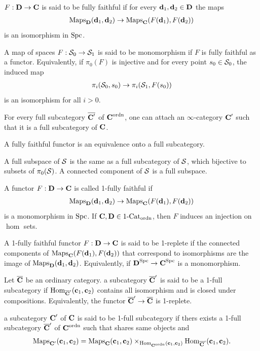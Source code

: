 {\np $F:\D\to\C$ is said to be fully faithful if for every $\d_1,\d_2\in\D$ the maps
\begin{align*}
    \maps_{\D}(\d_1,\d_2) \to \maps_{\C}(F(\d_1),F(\d_2))
\end{align*}
is an isomorphism in $\spc$.

\np A map of spaces $F:\S_0\to \S_1$ is said to be monomorphism if $F$ is fully faithful as a functor.
Equivalently, if $\pi_0(F)$ is injective and for every point $s_0\in\S_0$, the induced map 
\begin{align*}
    \pi_i(\S_0,s_0) \to \pi_i(\S_1,F(s_0))
\end{align*}
is an isomorphism for all $i>0$.

\np For every full subcategory $\bar{\C'}$ of $\C^{\ordn}$, one can attach an $\infty$-category $\C'$ such that it is a 
full subcategory of $\C$.

\np A fully faithful functor is an equivalence onto a full subcategory.

\np A full subspace of $\S$ is the same as a full subcategory of $\S$, which bijective to subsets of $\pi_0(\S)$.
A connected component of $\S$ is a full subspace.

\np A functor $F:\D\to \C$ is called 1-fully faithful if 
\begin{align*}
    \maps_{\D}(\d_1,\d_2) \to \maps_{\C}(F(\d_1),F(\d_2))
\end{align*}
is a monomorphism in $\spc$. If $\C,\D\in \text{1-Cat}_{\ordn}$, then $F$ induces an injection on $\hom$ sets.

\np A 1-fully faithful functor $F:\D\to \C$ is said to be 1-replete if the connected components of $\maps_{\C}(F(\d_1),F(\d_2))$ that 
correspond to isomorphisms are the image of $\maps_{\D}(\d_1,\d_2)$.
Equivalently, if $\D^{\spc}\to \C^{\spc}$ is a monomorphism.

\np Let $\bar{\C}$ be an ordinary category. a subcategory $\bar{\C}'$ is said to be a 1-full subcategory if $\hom_{\bar{\C}'}(\c_1,\c_2)$ 
contains all isomorphism and is closed under compositions. Equivalently, the functor $\bar{\C}'\to \bar{\C}$ is 1-replete.

\np a subcategory $\C'$ of $\C$ is said to be 1-full subcategory if thers exists a 1-full subcategory $\bar{\C}'$ of $\C^{\ordn}$ such that shares same
objects and 
\begin{align*}
    \maps_{\C'}(\c_1,\c_2) = \maps_{\C}(\c_1,\c_2)\times_{\hom_{\C^{\ordn}}(\c_1,\c_2)} {\hom_{\bar{\C}'}(\c_1,\c_2)}.
\end{align*}

}
